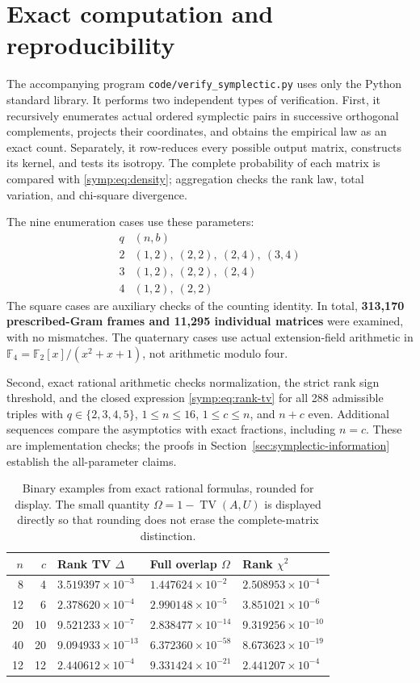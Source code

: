 \section{Exact computation and reproducibility}\label{sec:checks}
The accompanying program \texttt{code/verify\_symplectic.py} uses only the
Python standard library. It performs two independent types of verification.
First, it recursively enumerates actual ordered symplectic pairs in successive
orthogonal complements, projects their coordinates, and obtains the empirical
law as an exact count. Separately, it row-reduces every possible output matrix,
constructs its kernel, and tests its isotropy. The complete probability of
each matrix is compared with \eqref{symp:eq:density}; aggregation checks the
rank law, total variation, and chi-square divergence.

The nine enumeration cases use these parameters:
\[
\begin{array}{c|l}
q & (n,b)\\\hline
2 & (1,2),\ (2,2),\ (2,4),\ (3,4)\\
3 & (1,2),\ (2,2),\ (2,4)\\
4 & (1,2),\ (2,2)
\end{array}
\]
The square cases are auxiliary checks of the counting identity.
In total, \textbf{313,170 prescribed-Gram
frames and 11,295 individual matrices} were examined, with no mismatches.
The quaternary cases use actual extension-field arithmetic in
$\mathbb F_4=\mathbb F_2[x]/(x^2+x+1)$, not arithmetic modulo four.

Second, exact rational arithmetic checks normalization, the strict rank sign
threshold, and the closed expression \eqref{symp:eq:rank-tv} for all 288
admissible triples with $q\in\{2,3,4,5\}$, $1\le n\le16$, $1\le c\le n$,
and $n+c$ even. Additional sequences compare the asymptotics with exact
fractions, including $n=c$. These are implementation checks; the proofs in
Section~\ref{sec:symplectic-information} establish the all-parameter claims.

\begin{table}[htbp]
\centering\small
\begin{tabular}{rrlll}
\toprule
$n$ & $c$ & Rank TV $\Delta$ & Full overlap $\Omega$ & Rank $\chi^2$\\
\midrule
8 & 4 & $3.519397\times10^{-3}$ & $1.447624\times10^{-2}$ & $2.508953\times10^{-4}$ \\
12 & 6 & $2.378620\times10^{-4}$ & $2.990148\times10^{-5}$ & $3.851021\times10^{-6}$ \\
20 & 10 & $9.521233\times10^{-7}$ & $2.838477\times10^{-14}$ & $9.319256\times10^{-10}$ \\
40 & 20 & $9.094933\times10^{-13}$ & $6.372360\times10^{-58}$ & $8.673623\times10^{-19}$ \\
12 & 12 & $2.440612\times10^{-4}$ & $9.331424\times10^{-21}$ & $2.441207\times10^{-4}$ \\
\bottomrule
\end{tabular}
\caption{Binary examples from exact rational formulas, rounded for display.
The small quantity $\Omega=1-\operatorname{TV}(A,U)$ is displayed directly
so that rounding does not erase the complete-matrix distinction.}
\label{tab:numeric}
\end{table}

